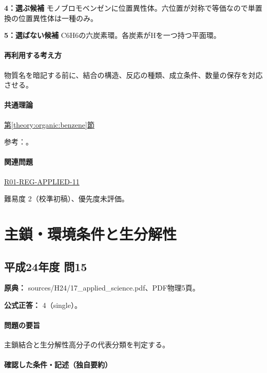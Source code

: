 \noindent\textbf{4：選ぶ候補} モノブロモベンゼンに位置異性体。六位置が対称で等価なので単置換の位置異性体は一種のみ。\par

\noindent\textbf{5：選ばない候補} C6H6の六炭素環。各炭素がHを一つ持つ平面環。\par

\paragraph{再利用する考え方} 物質名を暗記する前に、結合の構造、反応の種類、成立条件、数量の保存を対応させる。

\paragraph{共通理論} \hyperref[theory:organic:benzene]{第\ref*{theory:organic:benzene}節}

\par 参考：\cite{organic_benzene}。

\paragraph{関連問題} \hyperref[q:r01-reg-applied-11]{R01-REG-APPLIED-11}

\par 難易度 2（校準初稿）、優先度未評価。

\section{主鎖・環境条件と生分解性}

\subsection{平成24年度 問15}
\label{q:h24-reg-applied-15}

\noindent\textbf{原典：} sources/H24/17\_applied\_science.pdf、PDF物理5頁。

\textbf{公式正答：} 4（single）。

\paragraph{問題の要旨} 主鎖結合と生分解性高分子の代表分類を判定する。

\paragraph{確認した条件・記述（独自要約）}\mbox{}\par

